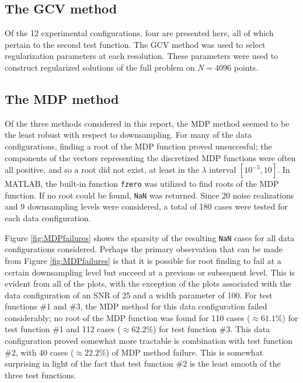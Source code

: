 \documentclass[12pt]{article}
\newcommand{\regparam}{\lambda}
\begin{document}
\subsection{The GCV method} \label{The GCV method}
Of the 12 experimental configurations, four are presented here, all of which pertain to the second test function. The GCV method was used to select regularization parameters at each resolution. These parameters were used to construct regularized solutions of the full problem on $N = 4096$ points.

\subsection{The MDP method} \label{The MDP method}
Of the three methods considered in this report, the MDP method seemed to be the least robust with respect to downsampling. For many of the data configurations, finding a root of the MDP function proved unsuccesful; the components of the vectors representing the discretized MDP functions were often all positive, and so a root did not exist, at least in the $\regparam$ interval $[10^{-5},10]$. In MATLAB, the built-in function \texttt{fzero} was utilized to find roots of the MDP function. If no root could be found, \texttt{NaN} was returned. Since 20 noise realizations and 9 downsampling levels were considered, a total of 180 cases were tested for each data configuration.   \par 
Figure \ref{fig:MDPfailures} shows the sparsity of the resulting \texttt{NaN} cases for all data configurations considered. Perhaps the primary observation that can be made from Figure \ref{fig:MDPfailures} is that it is possible for root finding to fail at a certain downsampling level but succeed at a previous or subsequent level. This is evident from all of the plots, with the exception of the plots associated with the data configuration of an SNR of 25 and a width parameter of 100. For test functions \#1 and \#3, the MDP method for this data configuration failed considerably; no root of the MDP function was found for 110 cases ($\approx 61.1\%$) for test function \#1 and 112 cases ($\approx 62.2 \%$) for test function \#3. This data configuration proved somewhat more tractable is combination with test function \#2, with 40 cases ($\approx 22.2 \%$) of MDP method failure. This is somewhat surprising in light of the fact that test function \#2 is the least smooth of the three test functions.  \par 
\end{document}
